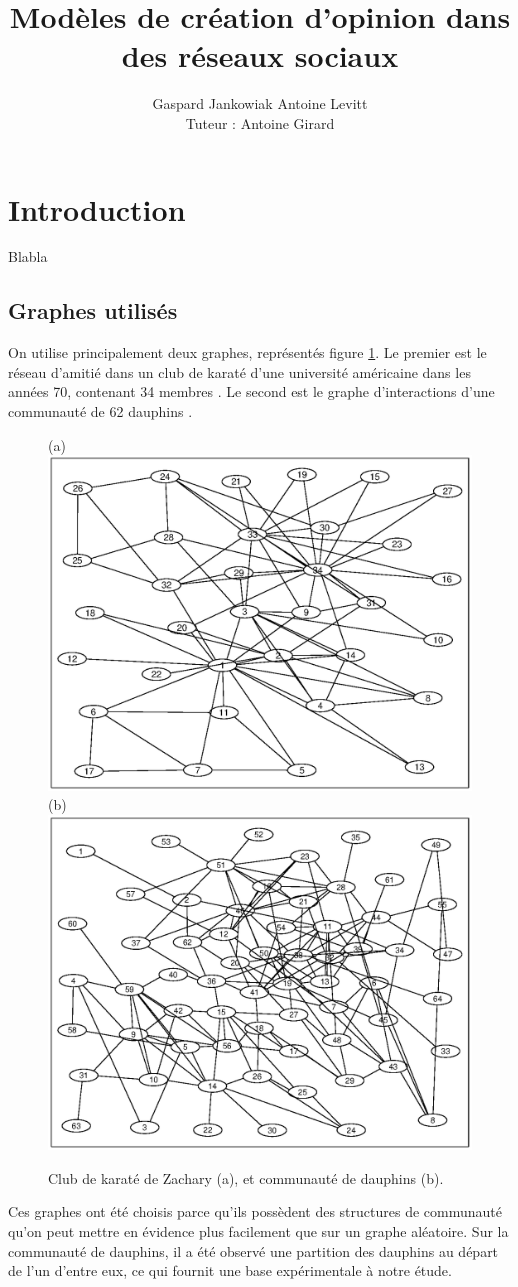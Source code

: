 \documentclass[12pt]{article}
\begin{document}
\author{Gaspard Jankowiak \quad Antoine Levitt\\ Tuteur : Antoine Girard}
\title{Modèles de création d'opinion dans des réseaux sociaux}
\maketitle
{}
\tableofcontents
\newpage


\section{Introduction}
Blabla
\subsection{Graphes utilisés}
On utilise principalement deux graphes, représentés figure
\ref{graphes}.  Le premier est le réseau d'amitié dans un club de
karaté d'une université américaine dans les années 70, contenant 34
membres \cite{zachary}. Le second est le graphe d'interactions d'une
communauté de 62 dauphins \cite{dolphins}.

\begin{figure}[htb]
  \centering
  (a)
  \includegraphics[width=.4 \textwidth]{zachary}
  (b)
  \includegraphics[width=.4 \textwidth]{dolphins}
  \caption{Club de karaté de Zachary (a), et communauté de dauphins (b).}
  \label{graphes}
\end{figure}

Ces graphes ont été choisis parce qu'ils possèdent des
structures de communauté qu'on peut mettre en évidence plus
facilement que sur un graphe aléatoire. Sur la communauté de
dauphins, il a été observé une partition des dauphins au départ
de l'un d'entre eux, ce qui fournit une base expérimentale à
notre étude.
\end{document}

